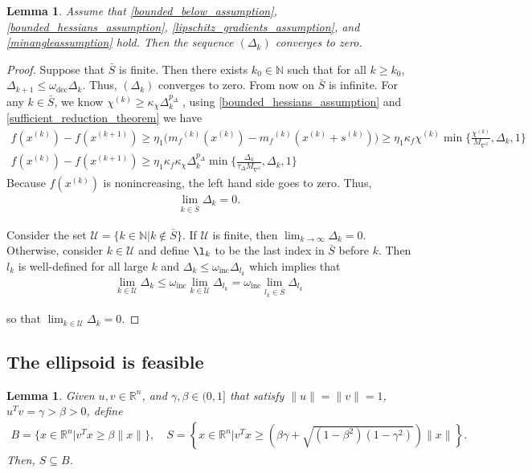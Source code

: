 \documentclass{article}
\newtheorem{lemma}[theorem]{Lemma}
\theoremstyle{case}
\newcommand{\maxhessian}{{M_{\nabla^2}}}
\newcommand{\xk}{{x^{(k)}}}
\newcommand{\xkpo}{{{x}^{(k+1)}}}
\newcommand{\Rn}{\mathbb R^n}
\newcommand{\naturals}{\mathbb N}
\newcommand{\dk}{\Delta_k}
\newcommand{\mfk}{{{m}_f}^{(k)}}
\newcommand{\sk}{{{s}^{(k)}}}
\newcommand{\chik}{{\chi^{(k)}}}
\newcommand{\omegainc}{\omega_{\text{inc}}}
\newcommand{\omegadec}{\omega_{\text{dec}}}
\newcommand{\oalpha}{\tau_{\Delta}}
\newcommand{\dkpo}{\Delta_{k+1}}
\begin{document}
\begin{lemma}
\label{delta_to_zero}
Assume that
\cref{bounded_below_assumption},
\cref{bounded_hessians_assumption},
\cref{lipschitz_gradients_assumption},
and \cref{minangleassumption} hold.
Then the sequence $(\dk)$ converges to zero.
\end{lemma}
 

\begin{proof}

Suppose that $\bar{S}$ is finite. Then there exists $k_0 \in \naturals$ such that for all $k \ge  k_0$, $\dkpo \le \omegadec \dk$.
Thus, $(\dk)$ converges to zero.
From now on $\bar{S}$ is infinite.  
For any $k \in \bar{S}$, we know $\chik \ge \kappa_{\chi}\dk^{p_{\Delta}}$ , using \cref{bounded_hessians_assumption} and \cref{sufficient_reduction_theorem} we have
\begin{align*}
f(\xk) -  f(\xkpo) \ge \eta_1 \big (\mfk(\xk) - \mfk(\xk + \sk)\big ) \ge \eta_1 \kappa_f \chik \min\{\frac{\chik}{\maxhessian}, \dk, 1\}\\
f(\xk) - f(\xkpo) \ge \eta_1\kappa_f \kappa_{\chi}\dk^{p_{\Delta}}\min\{\frac{\dk}{\oalpha \maxhessian}, \dk, 1\}
\end{align*}
Because $f(\xk)$ is nonincreasing, the left hand side goes to zero.
Thus,
\begin{align}
\lim_{k \in \bar{S}} \dk = 0.
\end{align}

Consider the set
$\mathcal U = \{ k \in \naturals | k \not \in \bar S \}$.
If $\mathcal U$ is finite, then $\lim_{k\to\infty}\dk = 0$.
Otherwise, consider $k \in \mathcal U$ and define $\l_k$ to be the last index in $\bar S$ before $k$.
Then $l_k$ is well-defined for all large $k$  and $\dk \le \omegainc \Delta_{l_k}$ which implies that
\begin{align}
\lim_{k \in \mathcal U } \dk \le \omegainc \lim_{k \in \mathcal U} \Delta_{l_k} = \omegainc \lim_{l_k \in \bar{S}} \Delta_{l_k}
\end{align}

so that $\lim_{k \in \mathcal U} \dk = 0$.
\end{proof}




\subsection{The ellipsoid is feasible}


\begin{lemma}
\label{cone_subset_cone}
Given $u, v \in \Rn$, and $\gamma, \beta \in (0, 1]$ that satisfy $\|u\| = \|v\|= 1$, $u^Tv = \gamma > \beta > 0$, define
\begin{align*}
B = \{x\in\Rn | {v}^Tx \ge \beta\|x\|\}, \quad
S = \left\{x\in\Rn \bigg| v^Tx \ge \left(\beta\gamma + \sqrt{(1 - \beta^2)\left(1 - \gamma^2\right)}\right)\|x\| \right\}. 
\end{align*}
Then, $S \subseteq B$.
\end{lemma}
\end{document}
